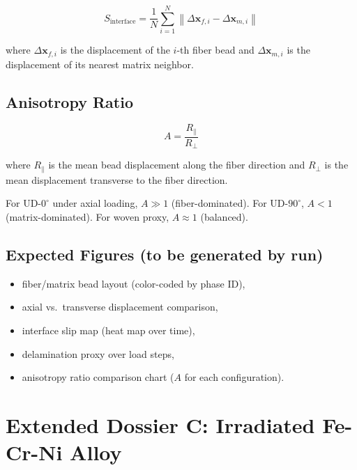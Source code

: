 \documentclass[12pt]{article}
\begin{document}
\begin{equation}
	S_{\mathrm{interface}} =
	\frac{1}{N}
	\sum_{i=1}^{N}
	\left\|
	\Delta \mathbf{x}_{f,i} - \Delta \mathbf{x}_{m,i}
	\right\|
	\label{eq:slip}
\end{equation}

where $\Delta \mathbf{x}_{f,i}$ is the displacement of the $i$-th fiber bead and
$\Delta \mathbf{x}_{m,i}$ is the displacement of its nearest matrix neighbor.

\subsection{Anisotropy Ratio}

\begin{equation}
	A = \frac{R_{\parallel}}{R_{\perp}}
	\label{eq:anisotropy}
\end{equation}

where $R_{\parallel}$ is the mean bead displacement along the fiber direction
and $R_{\perp}$ is the mean displacement transverse to the fiber direction.

For UD-$0^\circ$ under axial loading, $A \gg 1$ (fiber-dominated).
For UD-$90^\circ$, $A < 1$ (matrix-dominated).
For woven proxy, $A \approx 1$ (balanced).

\subsection{Expected Figures (to be generated by run)}

\begin{itemize}[noitemsep]
	\item fiber/matrix bead layout (color-coded by phase ID),
	\item axial vs.\ transverse displacement comparison,
	\item interface slip map (heat map over time),
	\item delamination proxy over load steps,
	\item anisotropy ratio comparison chart ($A$ for each configuration).
\end{itemize}

\section{Extended Dossier C: Irradiated Fe-Cr-Ni Alloy}
\label{app:alloy}
\end{document}
